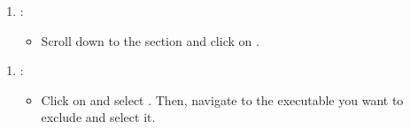 \documentclass[letterpaper,10pt,english]{sphinxmanual}
\begin{document}
\begin{figure}[htbp]
\centering

\noindent{}
\end{figure}
\begin{enumerate}
%
\setcounter{enumi}{3}
\item {} 
\sphinxAtStartPar
{}:
\begin{itemize}
\item {} 
\sphinxAtStartPar
Scroll down to the  section and click on .

\end{itemize}

\end{enumerate}

\begin{figure}[htbp]
\centering

\noindent{}
\end{figure}
\begin{enumerate}
%
\setcounter{enumi}{4}
\item {} 
\sphinxAtStartPar
{}:
\begin{itemize}
\item {} 
\sphinxAtStartPar
Click on  and select . Then, navigate to the executable you want to exclude and select it.

\end{itemize}

\end{enumerate}

\begin{figure}[htbp]
\centering

\noindent{}
\end{figure}

\begin{figure}[htbp]
\centering

\noindent{}
\end{figure}

\begin{figure}[htbp]
\centering

\noindent{}
\end{figure}
\end{document}
